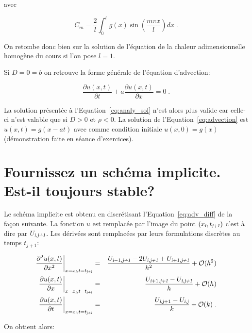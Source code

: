 \documentclass[a4paper, 12pt]{report}
\begin{document}
 avec

 \begin{equation}
   C_m = \frac{2}{l} \int_0^l g(x) \sin \left (\frac{m \pi x}{l} \right )  dx \;.
 \end{equation}

 On retombe donc bien sur la solution de l'équation de la chaleur adimensionnelle
 homogène du cours si l'on pose $l=1$.

Si $D=0=b$ on retrouve la forme générale de l'équation d'advection:

\begin{equation}
  \frac{\partial u(x,t)}{\partial t} + a \frac{\partial u(x,t)}{\partial x} = 0 \;.
  \label{eq:advection}
\end{equation}

La solution présentée à l'Equation~\ref{eq:analy_sol} n'est alors plus valide
car celle-ci n'est valable que si $D>0$ et $\rho < 0$. La solution de
l'Equation~\ref{eq:advection} est $u(x,t) = g(x-at)$ avec comme condition
initiale $u(x,0) = g(x)$ (démonstration faite en séance d'exercices).


\section{Fournissez un schéma implicite. Est-il toujours stable?}

Le schéma implicite est obtenu en discrétisant l'Equation~\ref{eq:adv_diff}
de la façon suivante. La fonction $u$ est remplacée par l'image du point $(x_{\textsl{i}},t_{\textsl{j+1}})$
c'est à dire par $U_{\textsl{i},\textsl{j+1}}$. Les dérivées sont remplacées par leurs formulations discrètes
au temps $t_{j+1}$:

\begin{align}
  \frac{\partial^2 u (x,t)}{\partial x^2} \biggr |_{x=x_{\textsl{i}}, t=t_{\textsl{j+1}}} &=& \frac{U_{\textsl{i}-1,\textsl{j+1}} - 2 U_{\textsl{i},\textsl{j+1}} + U_{\textsl{i}+1,\textsl{j+1}}}{h^2} + \mathcal{O}(h^2)\\
  \frac{\partial u (x,t)}{\partial x} \biggr |_{x=x_{\textsl{i}}, t=t_{\textsl{j+1}}} &=& \frac{U_{\textsl{i}+1,\textsl{j+1}} - U_{\textsl{i},\textsl{j+1}}}{h} + \mathcal{O}(h)\\
  \frac{\partial u (x,t)}{\partial t} \biggr |_{x=x_{\textsl{i}}, t=t_{\textsl{j+1}}} &=& \frac{U_{\textsl{i},\textsl{j}+1} - U_{\textsl{i},\textsl{j}}}{k} + \mathcal{O}(k) \;.
\end{align}

On obtient alors:
\end{document}
